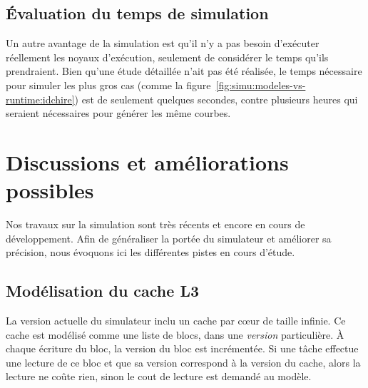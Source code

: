 \subsection*{Évaluation du temps de simulation}

Un autre avantage de la simulation est qu'il n'y a pas besoin d'exécuter réellement les noyaux d'exécution, seulement de considérer le temps qu'ils prendraient.
Bien qu'une étude détaillée n'ait pas été réalisée, le temps nécessaire pour simuler les plus gros cas (comme la figure~\ref{fig:simu:modeles-vs-runtime:idchire}) est de seulement quelques secondes, contre plusieurs heures qui seraient nécessaires pour générer les même courbes.








\section{Discussions et améliorations possibles}\label{sec:simulation:next}

Nos travaux sur la simulation sont très récents et encore en cours de développement.
Afin de généraliser la portée du simulateur et améliorer sa précision, nous évoquons ici les différentes pistes en cours d'étude.

\subsection{Modélisation du cache L3}

La version actuelle du simulateur inclu un cache par cœur de taille infinie.
Ce cache est modélisé comme une liste de blocs, dans une \emph{version} particulière.
À chaque écriture du bloc, la version du bloc est incrémentée.
Si une tâche effectue une lecture de ce bloc et que sa version correspond à la version du cache, alors la lecture ne coûte rien, sinon le cout de lecture est demandé au modèle.

